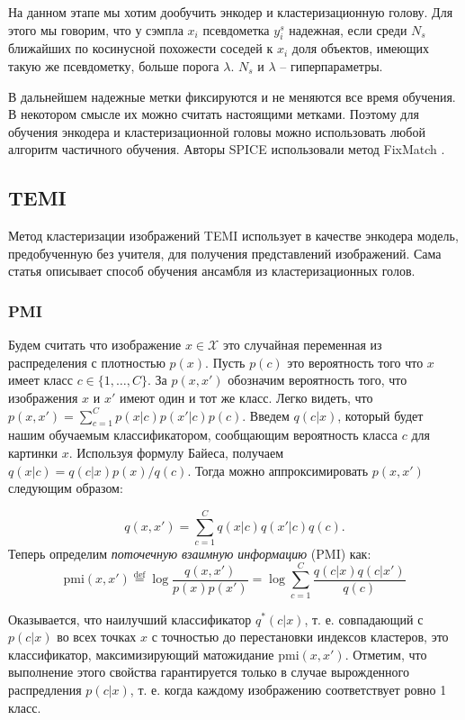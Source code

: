 \documentclass[a4paper,12pt]{extarticle}
\newcommand{\defeq}{\stackrel{\text{def}}{=}}
\begin{document}
На данном этапе мы хотим дообучить энкодер и кластеризационную голову.
Для этого мы говорим, что у сэмпла $x_i$ псевдометка $y_i^s$ 
надежная, если среди $N_s$ ближайших по косинусной похожести 
соседей к $x_i$ доля объектов, имеющих такую же псевдометку, 
больше порога $\lambda$. $N_s$ и $\lambda$ -- гиперпараметры.

В дальнейшем надежные метки фиксируются и не меняются 
все время обучения. В некотором смысле их можно считать 
настоящими метками. Поэтому для обучения энкодера и 
кластеризационной головы можно использовать любой 
алгоритм частичного обучения. Авторы SPICE использовали метод
FixMatch \cite{NEURIPS2020_06964dce}.

\subsection{TEMI}

Метод кластеризации изображений TEMI \cite{Adaloglou_2023_BMVC} 
использует в качестве энкодера модель, 
предобученную без учителя, для получения представлений изображений. 
Сама статья описывает способ обучения ансамбля из кластеризационных голов.

\subsubsection{PMI}

Будем считать что изображение $x\in\mathcal{X}$ это случайная 
переменная из распределения с плотностью $p(x)$.
Пусть $p(c)$ это вероятность того что $x$ имеет 
класс $c\in\{1, \ldots, C\}$. За $p(x, x')$ обозначим 
вероятность того, что изображения 
$x$ и $x'$ имеют один и тот же класс. Легко видеть, что 
$p(x, x')=\sum_{c=1}^{C}p(x|c)p(x'|c)p(c)$. Введем 
$q(c|x)$, который будет нашим обучаемым классификатором, 
сообщающим вероятность класса $c$ для картинки $x$. 
Используя формулу Байеса, получаем $q(x|c)=
q(c|x)p(x)/q(c)$. Тогда можно аппроксимировать 
$p(x, x')$ следующим образом:

\[
	q(x, x')=\sum_{c=1}^C q(x|c)q(x'|c) q(c).
\]
Теперь определим \textit{поточечную взаимную информацию} (PMI)
как:
\[
	\text{pmi}(x, x') \defeq \log \frac{q(x, x')}{p(x)p(x')} = 
	\log \sum_{c=1}^C \frac{q(c|x)q(c|x')}{q(c)}
\]

Оказывается, что наилучший классификатор $q^{\ast}(c|x)$, 
т. е. совпадающий с $p(c|x)$ во всех точках $x$ с 
точностью до перестановки индексов кластеров, 
это классификатор, максимизирующий матожидание $\text{pmi}(x, x')$.
Отметим, что выполнение этого свойства гарантируется только 
в случае вырожденного распредления $p(c|x)$, т. е. когда 
каждому изображению соответствует ровно 1 класс.
\end{document}

